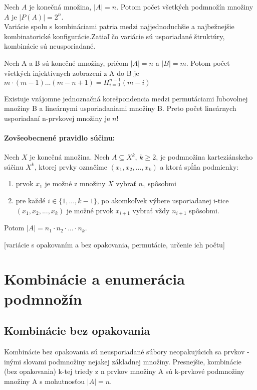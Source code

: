     Nech $A$ je konečná množina, $|A| = n$. Potom počet všetkých podmnožín množiny $A$ je $|P(A)| = 2^{n}$.\\

  Variácie spolu s kombináciami patria medzi najjednoduchšie a najbežnejšie kombinatorické konfigurácie.Zatiaľ čo variácie sú usporiadané štruktúry, kombinácie sú neusporiadané. 

  Nech A a B sú konečné množiny, pričom $|A| = n$ a $|B| = m$. Potom počet všetkých injektívnych zobrazení z A do B je \\
  $ m \cdot (m - 1) . . . (m - n + 1) = \Pi_{i = 0}^{n - 1} (m - i)$


  Existuje vzájomne jednoznačná korešpondencia medzi permutáciami ľubovolnej množiny B a lineárnymi usporiadaniami množiny B. Preto počet lineárnych usporiadaní n-prvkovej množiny je $n!$

  \paragraph{Zovšeobecnené pravidlo súčinu: }
  Nech $X$ je konečná množina. Nech $A \subseteq X^{k}$, $k \geq 2$, je podmnožina karteziánskeho súčinu $X^{k}$, ktorej prvky označíme $(x_{1}, x_{2}, ..., x_{k})$ a ktorá spĺňa podmienky:
  \begin{enumerate}
    \item prvok $x_{1}$ je možné z množiny $X$ vybrať $n_{1}$ spôsobmi
    \item pre každé $i \in \{1, ..., k - 1\} $, po akomkoľvek výbere usporiadanej i-tice $(x_{1}, x_{2}, ..., x_{k})$ je možné prvok $x_{i+1}$ vybrať vždy $n_{i+1}$ spôsobmi.
  \end{enumerate}

Potom $|A|=n_{1} \cdot n_{2} \cdot ... \cdot n_{k}$.

  [variácie s opakovaním a bez opakovania, permutácie, určenie ich počtu] 

\section {Kombinácie a enumerácia podmnožín}
  \subsection{Kombinácie bez opakovania}
    Kombinácie bez opakovania sú neusporiadané súbory neopakujúcich sa prvkov - inými slovami podmnožiny nejakej základnej množiny. Presnejšie, kombinácie (bez opakovania) k-tej triedy z n prvkov množiny A sú k-prvkové podmnožiny množiny A s mohutnosťou $|A| = n$.


